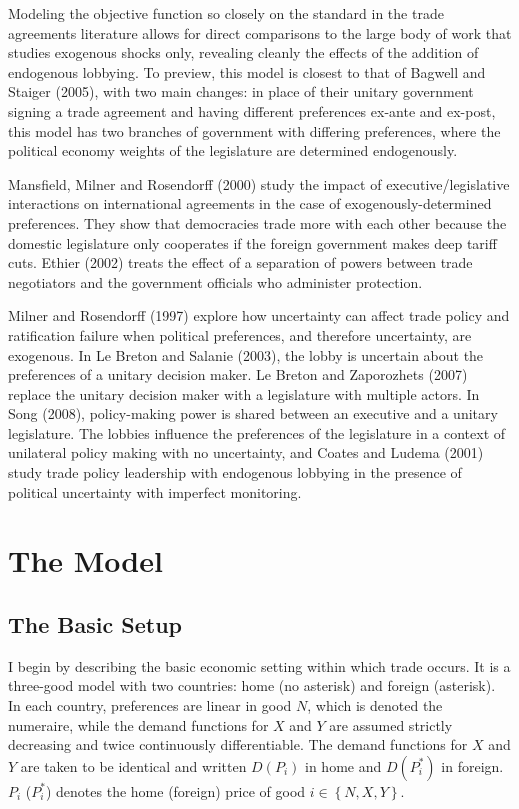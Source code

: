 \documentclass[10pt]{article}
\begin{document}
Modeling the objective function so closely on the standard in the trade agreements literature allows for direct comparisons to the large body of work that studies exogenous shocks only, revealing cleanly the effects of the addition of endogenous lobbying. To preview, this model is closest to that of Bagwell and Staiger (2005), with two main changes: in place of their unitary government signing a trade agreement and having different preferences ex-ante and ex-post, this model has two branches of government with differing preferences, where the political economy weights of the legislature are determined endogenously.
		
Mansfield, Milner and Rosendorff (2000) study the impact of executive/legislative interactions on international agreements in the case of exogenously-determined preferences. They show that democracies trade more with each other because the domestic legislature only cooperates if the foreign government makes deep tariff cuts. Ethier (2002) treats the effect of a separation of powers between trade negotiators and the government officials who administer protection.

Milner and Rosendorff (1997) explore how uncertainty can affect trade policy and ratification failure when political preferences, and therefore uncertainty, are exogenous. In Le Breton and Salanie (2003), the lobby is uncertain about the preferences of a unitary decision maker. Le Breton and Zaporozhets (2007) replace the unitary decision maker with a legislature with multiple actors. In Song (2008), policy-making power is shared between an executive and a unitary legislature. The lobbies influence the preferences of the legislature in a context of unilateral policy making with no uncertainty, and Coates and Ludema (2001) study trade policy leadership with endogenous lobbying in the presence of political uncertainty with imperfect monitoring.


\section{The Model}
\label{sec:model}

\subsection{The Basic Setup}
\label{sec:basic}
I begin by describing the basic economic setting within which trade occurs. It is a three-good model with two countries: home (no asterisk) and foreign (asterisk). In each country, preferences are linear in good $N$, which is denoted the numeraire, while the demand functions for $X$ and $Y$ are assumed strictly decreasing and twice continuously differentiable. The demand functions for $X$ and $Y$ are taken to be identical and written $D(P_i)$ in home and $D(P_i^*)$ in foreign. $P_i$ ($P_i^*$) denotes the home (foreign) price of good $i \in \left\{N,X,Y\right\}$.
\end{document}
